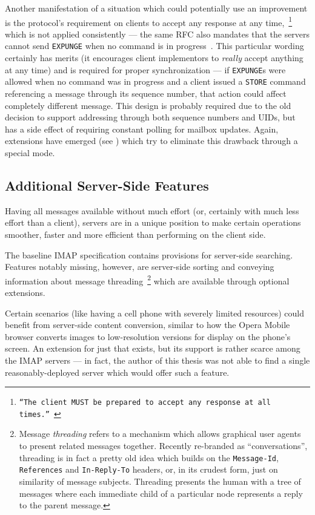 \documentclass[trojita]{subfiles}
\begin{document}
Another manifestation of a situation which could potentially use an improvement is the protocol's requirement on clients
to accept any response at any time,~\footnote{{\tt ``The client MUST be prepared to accept any response at all
times.''}~\cite[p. 61]{rfc3501}} which is not applied consistently --- the same RFC also mandates that the servers cannot
send {\tt EXPUNGE} when no command is in progress~\cite[p. 72]{rfc3501}.  This particular wording certainly has merits
(it encourages client implementors to {\em really} accept anything at any time) and is required for proper
synchronization --- if {\tt EXPUNGE}s were allowed when no command was in progress and a client issued a {\tt STORE}
command referencing a message through its sequence number, that action could affect completely different message.  This
design is probably required due to the old decision to support addressing through both sequence numbers and UIDs, but
has a side effect of requiring constant polling for mailbox updates.  Again, extensions have emerged (see
) which try to eliminate this drawback through a special mode.

\subsection{Additional Server-Side Features}

Having all messages available without much effort (or, certainly with much less effort than a client), servers are in a
unique position to make certain operations smoother, faster and more efficient than performing on the client side.

The baseline IMAP specification contains provisions for server-side searching.  Features notably missing, however, are
server-side sorting and conveying information about message threading~\footnote{Message {\em threading} refers to a
mechanism which allows graphical user agents to present related messages together.  Recently re-branded as
``conversations'', threading is in fact a pretty old idea which builds on the {\tt Message-Id}, {\tt References} and
{\tt In-Reply-To} headers, or, in its crudest form, just on similarity of message subjects.  Threading presents the
human with a tree of messages where each immediate child of a particular node represents a reply to the parent message.}
which are available through optional extensions.

Certain scenarios (like having a cell phone with severely limited resources) could benefit from server-side content
conversion, similar to how the Opera Mobile browser converts images to low-resolution versions for display on the
phone's screen.  An extension for just that exists, but its support is rather scarce among the IMAP servers --- in fact,
the author of this thesis was not able to find a single reasonably-deployed server which would offer such a feature.
\end{document}
